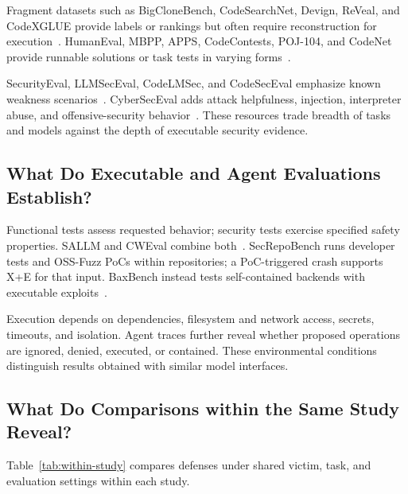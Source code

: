 \documentclass[acmsmall,screen,review,nonacm]{acmart}
\begin{document}
Fragment datasets such as BigCloneBench, CodeSearchNet, Devign, ReVeal, and CodeXGLUE provide labels or rankings but often require reconstruction for execution~\cite{svajlenko2015bigclonebench,husain2019codesearchnet,zhou2019devign,chakraborty2021reveal,lu2021codexglue}. HumanEval, MBPP, APPS, CodeContests, POJ-104, and CodeNet provide runnable solutions or task tests in varying forms~\cite{chen2021humaneval,austin2021mbpp,hendrycks2021apps,li2022codecontests,mou2016poj,puri2021codenet}.

SecurityEval, LLMSecEval, CodeLMSec, and CodeSecEval emphasize known weakness scenarios~\cite{siddiq2022securityeval,tony2023llmseval,hajipour2024codelmsec,codeseceval2024}. CyberSecEval adds attack helpfulness, injection, interpreter abuse, and offensive-security behavior~\cite{bhatt2023cyberseceval,cyberseceval2,cyberseceval3}. These resources trade breadth of tasks and models against the depth of executable security evidence.

\subsection{What Do Executable and Agent Evaluations Establish?}
Functional tests assess requested behavior; security tests exercise specified safety properties. SALLM and CWEval combine both~\cite{siddiq2024sallm,cweval2025}. SecRepoBench runs developer tests and OSS-Fuzz PoCs within repositories; a PoC-triggered crash supports \textsf{X+E} for that input. BaxBench instead tests self-contained backends with executable exploits~\cite{secrepobench2025,baxbench2025}.

Execution depends on dependencies, filesystem and network access, secrets, timeouts, and isolation. Agent traces further reveal whether proposed operations are ignored, denied, executed, or contained. These environmental conditions distinguish results obtained with similar model interfaces.

\FloatBarrier
\subsection{What Do Comparisons within the Same Study Reveal?}
\label{sec:within-study}

Table~\ref{tab:within-study} compares defenses under shared victim, task, and evaluation settings within each study.
\end{document}
